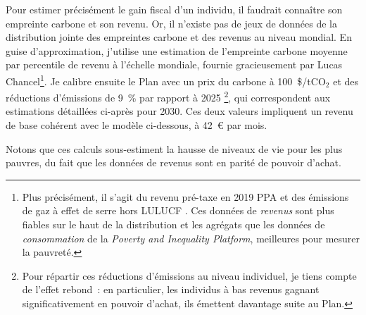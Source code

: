\documentclass[a5paper,french,openany]{memoir}
\begin{document}
Pour estimer précisément le gain fiscal d'un individu, il faudrait connaître son empreinte carbone et son revenu. Or, il n'existe pas de jeux de données de la distribution jointe des empreintes carbone et des revenus au niveau mondial. En guise d'approximation, j'utilise une estimation de l'empreinte carbone moyenne par percentile de revenu à l'échelle mondiale, fournie gracieusement par Lucas Chancel\footnote{Plus précisément, il s'agit du revenu pré-taxe en \textit{\texteuro{}} 2019 PPA et des émissions de gaz à effet de serre hors LULUCF%
. Ces données de \textit{revenus} sont plus fiables sur le haut de la distribution et les agrégats que les données de \textit{consommation} de la \textit{Poverty and Inequality Platform}, meilleures pour mesurer la pauvreté.%
}. Je calibre ensuite le Plan avec %
un prix du carbone à 100~\$/tCO$_\text{2}$ et des réductions d'émissions de 9~\% par rapport à 2025%
\footnote{Pour répartir ces réductions d'émissions au niveau individuel, je tiens compte de l'effet rebond~: en particulier, les individus à bas revenus gagnant significativement en pouvoir d'achat, ils émettent davantage suite au Plan.}, qui correspondent aux estimations détaillées ci-après pour 2030. Ces deux valeurs impliquent un revenu de base cohérent avec le modèle ci-dessous, à 42~\euro{} par mois. %

Notons que ces calculs sous-estiment la hausse de niveaux de vie pour les plus pauvres, du fait que les données de revenus sont en parité de pouvoir d'achat.
\end{document}

